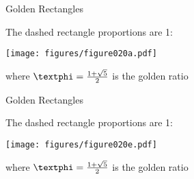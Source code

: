 \documentclass[14pt]{beamer}
\begin{document}



    \begin{frame}{Golden Rectangles}
        \begin{center}
            The dashed rectangle proportions are 1:\textphi
        \end{center}
        \hspace{4.1em} \texttt{[image: figures/figure020a.pdf]} \\
        \begin{center}
            where $\text{\textphi} =\tfrac{1+\sqrt{5}}{2}$ is the golden ratio
        \end{center}
    \end{frame}


    \begin{frame}{Golden Rectangles}
        \begin{center}
            The dashed rectangle proportions are 1:\textphi
        \end{center}
        \hspace{4.1em} \texttt{[image: figures/figure020e.pdf]} \\
        \begin{center}
            where $\text{\textphi} =\tfrac{1+\sqrt{5}}{2}$ is the golden ratio
        \end{center}
    \end{frame}
\end{document}
